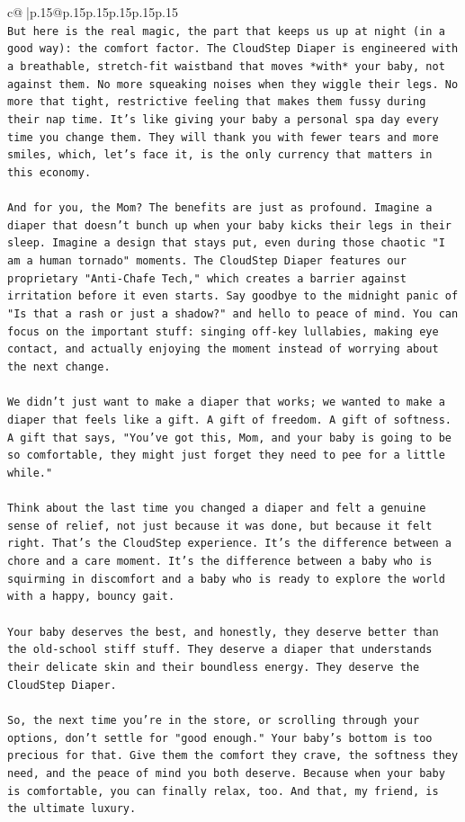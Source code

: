 \documentclass{article}
\begin{document}
{\begin{supertabular}{c@{$\;$}|p{.15\linewidth}@{}p{.15\linewidth}p{.15\linewidth}p{.15\linewidth}p{.15\linewidth}p{.15\linewidth}}
{{{\\ 
\texttt{But here is the real magic, the part that keeps us up at night (in a good way): the comfort factor. The CloudStep Diaper is engineered with a breathable, stretch{-}fit waistband that moves *with* your baby, not against them. No more squeaking noises when they wiggle their legs. No more that tight, restrictive feeling that makes them fussy during their nap time. It's like giving your baby a personal spa day every time you change them. They will thank you with fewer tears and more smiles, which, let's face it, is the only currency that matters in this economy.} \\
\\ 
\texttt{And for you, the Mom? The benefits are just as profound. Imagine a diaper that doesn't bunch up when your baby kicks their legs in their sleep. Imagine a design that stays put, even during those chaotic "I am a human tornado" moments. The CloudStep Diaper features our proprietary "Anti{-}Chafe Tech," which creates a barrier against irritation before it even starts. Say goodbye to the midnight panic of "Is that a rash or just a shadow?" and hello to peace of mind. You can focus on the important stuff: singing off{-}key lullabies, making eye contact, and actually enjoying the moment instead of worrying about the next change.} \\
\\ 
\texttt{We didn't just want to make a diaper that works; we wanted to make a diaper that feels like a gift. A gift of freedom. A gift of softness. A gift that says, "You've got this, Mom, and your baby is going to be so comfortable, they might just forget they need to pee for a little while."} \\
\\ 
\texttt{Think about the last time you changed a diaper and felt a genuine sense of relief, not just because it was done, but because it felt right. That's the CloudStep experience. It's the difference between a chore and a care moment. It's the difference between a baby who is squirming in discomfort and a baby who is ready to explore the world with a happy, bouncy gait.} \\
\\ 
\texttt{Your baby deserves the best, and honestly, they deserve better than the old{-}school stiff stuff. They deserve a diaper that understands their delicate skin and their boundless energy. They deserve the CloudStep Diaper.} \\
\\ 
\texttt{So, the next time you're in the store, or scrolling through your options, don't settle for "good enough." Your baby's bottom is too precious for that. Give them the comfort they crave, the softness they need, and the peace of mind you both deserve. Because when your baby is comfortable, you can finally relax, too. And that, my friend, is the ultimate luxury.} \\
}}}
\end{supertabular}}
\end{document}
